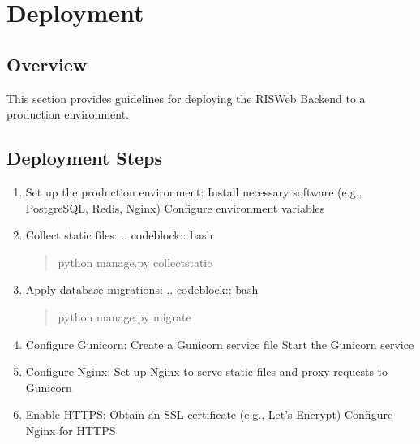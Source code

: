 \documentclass[letterpaper,10pt,english]{sphinxmanual}
\begin{document}
\sphinxstepscope


\section{Deployment}
\label{\detokenize{deployment/index:deployment}}\label{\detokenize{deployment/index::doc}}

\subsection{Overview}
\label{\detokenize{deployment/index:overview}}
\sphinxAtStartPar
This section provides guidelines for deploying the RIS\sphinxhyphen{}Web Backend to a production environment.


\subsection{Deployment Steps}
\label{\detokenize{deployment/index:deployment-steps}}\begin{enumerate}
%
\item {} 
\sphinxAtStartPar
Set up the production environment:
\sphinxhyphen{} Install necessary software (e.g., PostgreSQL, Redis, Nginx)
\sphinxhyphen{} Configure environment variables

\item {} 
\sphinxAtStartPar
Collect static files:
.. code\sphinxhyphen{}block:: bash
\begin{quote}

\sphinxAtStartPar
python manage.py collectstatic
\end{quote}

\item {} 
\sphinxAtStartPar
Apply database migrations:
.. code\sphinxhyphen{}block:: bash
\begin{quote}

\sphinxAtStartPar
python manage.py migrate
\end{quote}

\item {} 
\sphinxAtStartPar
Configure Gunicorn:
\sphinxhyphen{} Create a Gunicorn service file
\sphinxhyphen{} Start the Gunicorn service

\item {} 
\sphinxAtStartPar
Configure Nginx:
\sphinxhyphen{} Set up Nginx to serve static files and proxy requests to Gunicorn

\item {} 
\sphinxAtStartPar
Enable HTTPS:
\sphinxhyphen{} Obtain an SSL certificate (e.g., Let’s Encrypt)
\sphinxhyphen{} Configure Nginx for HTTPS

\end{enumerate}
\end{document}
